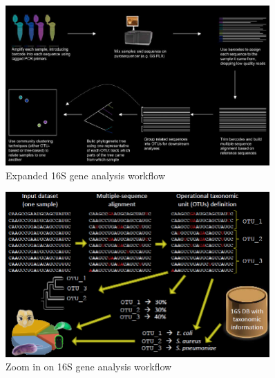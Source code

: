     \begin{figure}[!h]
      \centering
      \includegraphics[width=0.9\textwidth]{expanded_workflow.png}
      \caption{\label{fig:expanded_workflow}Expanded 16S gene analysis workflow}
    \end{figure}

    \begin{figure}[!h]
      \centering
      \includegraphics[width=0.9\textwidth]{zoom_in_16S.png}
      \caption{\label{fig:zoom_in_16S}Zoom in on 16S gene analysis workflow}
    \end{figure}

